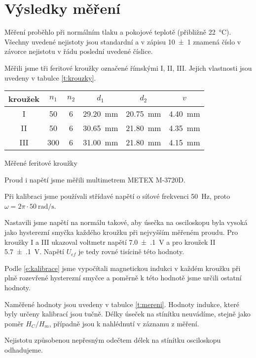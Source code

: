 \section*{Výsledky měření}
Měření proběhlo při normálním tlaku a pokojové teplotě (přibližně \SI{22}{\degreeCelsius}).
Všechny uvedené nejistoty jsou standardní a v zápisu \num{10(1)} znamená číslo v závorce nejistotu v řádu poslední uvedené číslice.

Měřili jsme tři feritové kroužky označené římskými I, II, III.
Jejich vlastnosti jsou uvedeny v tabulce \ref{t:krouzky}.

\begin{tabulka}[htbp]
\centering
\begin{tabular}{c|c|c|c|c|c}
kroužek & $n_1$ & $n_2$ & $d_1$ & $d_2$ & $v$ \\ \hline
I & \num{50} & \num{6} & \SI{29.20}{\mm} & \SI{20.75}{\mm} & \SI{4.40}{\mm} \\
II & \num{50} & \num{6} & \SI{30.65}{\mm} & \SI{21.80}{\mm} & \SI{4.35}{\mm} \\
III & \num{300} & \num{6} & \SI{31.00}{\mm} & \SI{21.80}{\mm} & \SI{4.15}{\mm} \\
\end{tabular}
\caption{Měřené feritové kroužky}
\label{t:krouzky}
\end{tabulka}

Proud i napětí jsme měřili multimetrem METEX M-3720D.

Při kalibraci jsme používali střídavé napětí o síťové frekvenci \SI{50}{\hertz}, proto $\omega = 2\pi\cdot\SI{50}{\radian\per\second}$.

Nastavili jsme napětí na normálu takové, aby úsečka na osciloskopu byla vysoká jako hysterezní smyčka každého kroužku při nejvyšším měřeném proudu.
Pro kroužky I a III ukazoval voltmetr napětí \SI{7.0(1)}{\volt} a pro kroužek II \SI{5.7(1)}{\volt}.
Napětí $U_{ef}$ je tedy rovné tisícině této hodnoty.

Podle \eqref{e:kalibrace} jsme vypočítali magnetickou indukci v každém kroužku při plně rozevřené hysterezní smyčce a poměrně k této hodnotě jsme určili ostatní hodnoty.

Naměřené hodnoty jsou uvedeny v tabulce \ref{t:mereni}.
Hodnoty indukce, které byly určeny kalibrací jsou tučně.
Délky úseček na stínítku neuvádíme, stejně jako poměr $H_C/H_m$, případně jsou k nahlédnutí v záznamu z měření.

Nejistotu způsobenou nepřesným odečtem délek na stínítku osciloskopu odhadujeme.

